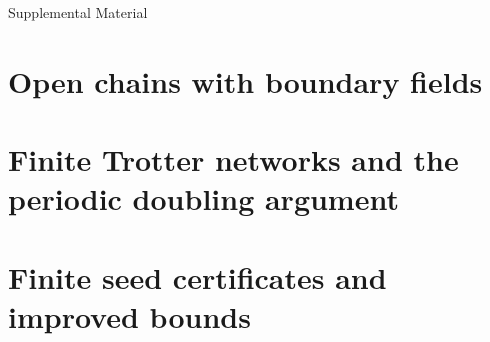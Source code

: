 \documentclass[aps,prl,reprint,amsmath,amssymb,nofootinbib]{revtex4-2}
\begin{document}
\clearpage
\appendix
\setcounter{secnumdepth}{3}
\def\theHtable{supp.\arabic{table}}
\def\theHfigure{supp.\arabic{figure}}
\def\theHtheorem{supp.\arabic{theorem}}
\def\theHlemma{supp.\arabic{lemma}}
\def\theHproposition{supp.\arabic{proposition}}
\renewcommand{\thesection}{S\Roman{section}}
\renewcommand{\thesubsection}{\thesection.\Alph{subsection}}
\makeatletter
\def\p@subsection{}
\def\p@subsubsection{\thesubsection.}
\makeatother
\setcounter{figure}{0}
\renewcommand{\thefigure}{S\arabic{figure}}
\setcounter{theorem}{0}
\renewcommand{\thetheorem}{S\arabic{theorem}}
\setcounter{lemma}{0}
\renewcommand{\thelemma}{S\arabic{lemma}}
\setcounter{proposition}{0}
\renewcommand{\theproposition}{S\arabic{proposition}}
\onecolumngrid
\setcounter{equation}{0}
\renewcommand{\theequation}{S\arabic{equation}}
\setcounter{table}{0}
\renewcommand{\thetable}{S\arabic{table}}
\begin{center}\large Supplemental Material\end{center}
\tableofcontents
\section{Open chains with boundary fields}

\section{Finite Trotter networks and the periodic doubling argument}

\section{Finite seed certificates and improved bounds}

\end{document}
